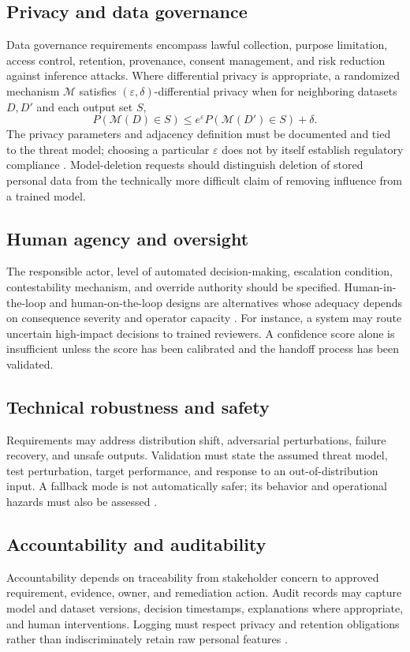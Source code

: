 \documentclass[11pt,a4paper]{article}
\begin{document}
\subsection{Privacy and data governance}
Data governance requirements encompass lawful collection, purpose limitation, access control, retention, provenance, consent management, and risk reduction against inference attacks. Where differential privacy is appropriate, a randomized mechanism $\mathcal M$ satisfies $(\varepsilon,\delta)$-differential privacy when for neighboring datasets $D,D'$ and each output set $S$,
\begin{equation}
P(\mathcal M(D)\in S)\leq e^{\varepsilon}P(\mathcal M(D')\in S)+\delta.
\end{equation}
The privacy parameters and adjacency definition must be documented and tied to the threat model; choosing a particular $\varepsilon$ does not by itself establish regulatory compliance \cite{dwork2014}. Model-deletion requests should distinguish deletion of stored personal data from the technically more difficult claim of removing influence from a trained model.

\subsection{Human agency and oversight}
The responsible actor, level of automated decision-making, escalation condition, contestability mechanism, and override authority should be specified. Human-in-the-loop and human-on-the-loop designs are alternatives whose adequacy depends on consequence severity and operator capacity \cite{hleg2019}. For instance, a system may route uncertain high-impact decisions to trained reviewers. A confidence score alone is insufficient unless the score has been calibrated and the handoff process has been validated.

\subsection{Technical robustness and safety}
Requirements may address distribution shift, adversarial perturbations, failure recovery, and unsafe outputs. Validation must state the assumed threat model, test perturbation, target performance, and response to an out-of-distribution input. A fallback mode is not automatically safer; its behavior and operational hazards must also be assessed \cite{zhang2020}.

\subsection{Accountability and auditability}
Accountability depends on traceability from stakeholder concern to approved requirement, evidence, owner, and remediation action. Audit records may capture model and dataset versions, decision timestamps, explanations where appropriate, and human interventions. Logging must respect privacy and retention obligations rather than indiscriminately retain raw personal features \cite{mitchell2019,reisman2018}.
\end{document}
